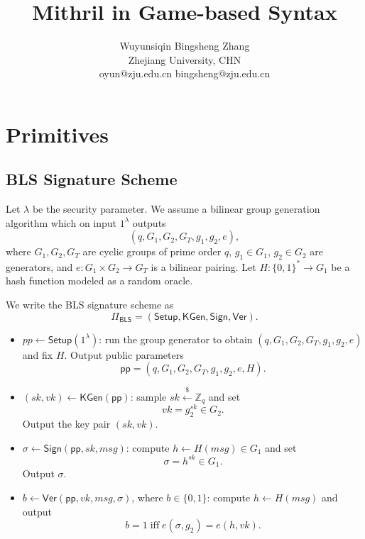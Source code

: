 \documentclass{article}
\title{Mithril in Game-based Syntax}
\author{Wuyunsiqin \quad \quad Bingsheng Zhang \\ 
Zhejiang University, CHN \\
oyun@zju.edu.cn \quad bingsheng@zju.edu.cn}
\begin{document}
\maketitle



\section{Primitives}

\subsection{BLS Signature Scheme}

Let $\lambda$ be the security parameter. We assume a bilinear group
generation algorithm which on input $1^\lambda$ outputs
\[
(q, G_1, G_2, G_T, g_1, g_2, e),
\]
where $G_1,G_2,G_T$ are cyclic groups of prime order $q$, $g_1\in G_1$,
$g_2\in G_2$ are generators, and
$e : G_1 \times G_2 \to G_T$ is a bilinear pairing. Let
$H : \{0,1\}^* \to G_1$ be a hash function modeled as a random oracle.

We write the BLS signature scheme as
\[
  \Pi_{\mathsf{BLS}} = (\mathsf{Setup}, \mathsf{KGen}, \mathsf{Sign}, \mathsf{Ver}).
\]

\begin{itemize}
  \item $pp \leftarrow\mathsf{Setup}(1^\lambda)$:  
        run the group generator to obtain
        $(q, G_1, G_2, G_T, g_1, g_2, e)$ and fix $H$.
        Output public parameters
        \[
          \mathsf{pp} = (q, G_1, G_2, G_T, g_1, g_2, e, H).
        \]

  \item $(sk,vk) \leftarrow\mathsf{KGen}(\mathsf{pp})$:  
        sample $sk \xleftarrow{\$} \mathbb{Z}_q$ and set
        \[
          vk = g_2^{sk} \in G_2.
        \]
        Output the key pair $(sk, vk)$.

  \item $\sigma \leftarrow \mathsf{Sign}(\mathsf{pp}, sk, msg)$:  
        compute $h \leftarrow H(msg) \in G_1$ and set
        \[
          \sigma = h^{sk} \in G_1.
        \]
        Output $\sigma$.

  \item $b \leftarrow \mathsf{Ver}(\mathsf{pp}, vk, msg, \sigma)$, where $b \in \{0,1\}$:  
        compute $h \leftarrow H(msg)$ and output
        \[
          b = 1
          \;\text{iff}\;
          e(\sigma, g_2) = e(h, vk).
        \]
\end{itemize}
\end{document}
